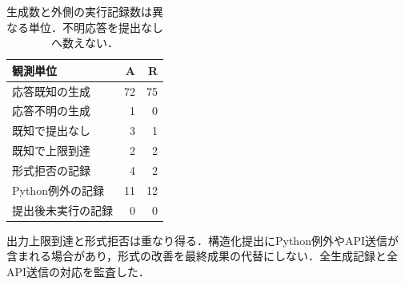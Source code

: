 \begin{table}[tb]
\centering\footnotesize\setlength{\tabcolsep}{3pt}
\caption{生成数と外側の実行記録数は異なる単位．不明応答を提出なしへ数えない．}
\begin{tabular}{lrr}
観測単位 & A & R \\ \hline
応答既知の生成 & 72 & 75 \\
応答不明の生成 & 1 & 0 \\
既知で提出なし & 3 & 1 \\
既知で上限到達 & 2 & 2 \\
形式拒否の記録 & 4 & 2 \\
Python例外の記録 & 11 & 12 \\
提出後未実行の記録 & 0 & 0 \\
\hline\end{tabular}
\end{table}
出力上限到達と形式拒否は重なり得る．構造化提出にPython例外やAPI送信が含まれる場合があり，形式の改善を最終成果の代替にしない．全生成記録と全API送信の対応を監査した．
